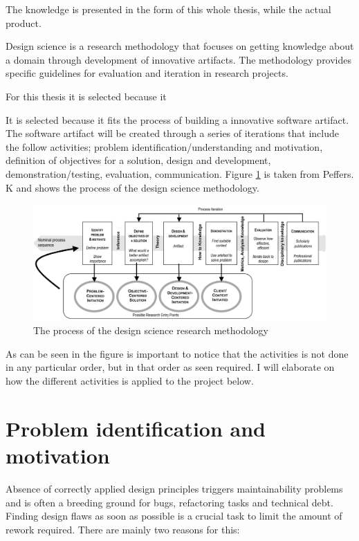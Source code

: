\documentclass{report}
\begin{document}
The knowledge is presented in the form of this whole thesis, while the actual product. 

Design science is a research methodology that focuses on getting knowledge about a domain through development of innovative artifacts. The methodology provides specific guidelines for evaluation and iteration in research projects. 

For this thesis it is selected because it 



It is selected because it fits the process of building a innovative software artifact. The software artifact will be created through a series of iterations that include the follow activities; problem identification/understanding and motivation, definition of objectives for a solution, design and development, demonstration/testing, evaluation, communication. Figure \ref{fig:designScience} is taken from Peffers. K \cite{Peffers2007ADS} and shows the process of the design science methodology. 

\begin{figure}[h!]
    \centering
    \includegraphics[width=\textwidth]{report/images/designScience.png}
    \caption{The process of the design science research methodology}
    \label{fig:designScience}
\end{figure}



As can be seen in the figure is important to notice that the activities is not done in any particular order, but in that order as seen required. I will elaborate on how the different activities is applied to the project below. 



\section{Problem identification and motivation}
Absence of correctly applied design principles triggers maintainability problems and is often a breeding ground for bugs, refactoring tasks and technical debt. Finding design flaws as soon as possible is a crucial task to limit the amount of rework required. There are mainly two reasons for this: 
\end{document}
